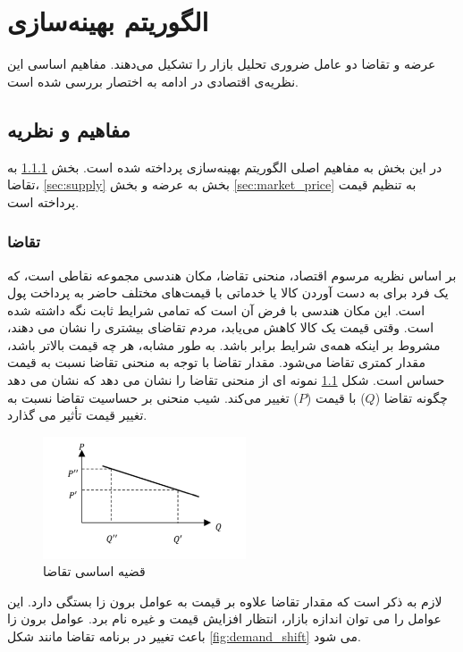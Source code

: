 \chapter{الگوریتم بهینه‌سازی }
عرضه و تقاضا دو عامل ضروری تحلیل بازار را تشکیل می‌دهند. مفاهیم اساسی این نظریه‌ی اقتصادی در ادامه به اختصار بررسی شده است.

\section{مفاهیم و نظریه}
در این بخش به مفاهیم اصلی الگوریتم بهینه‌سازی پرداخته شده است. بخش 
\ref{sec:demand}
به تقاضا، 
\ref{sec:supply} بخش
به عرضه
و بخش \ref{sec:market_price}
به تنظیم قیمت پرداخته است.

\subsection{تقاضا}\label{sec:demand}
بر اساس نظریه مرسوم اقتصاد، منحنی تقاضا، مکان هندسی مجموعه نقاطی است، که یک فرد برای به دست آوردن کالا یا خدماتی با قیمت‌های مختلف حاضر به پرداخت پول است. این مکان هندسی با فرض آن است که تمامی شرایط  ثابت نگه داشته شده است. 
 وقتی قیمت یک کالا کاهش می‌یابد، مردم تقاضای بیشتری را نشان می دهند، مشروط بر اینکه همه‌ی شرایط برابر باشد. به طور مشابه، هر چه قیمت بالاتر باشد، مقدار کمتری تقاضا می‌شود. مقدار تقاضا با توجه به منحنی تقاضا نسبت به قیمت حساس است. شکل \ref{fig:demand} نمونه ای از منحنی تقاضا را نشان می دهد که نشان می دهد چگونه تقاضا ($Q$) با قیمت ($P$) تغییر می‌کند. شیب منحنی بر حساسیت تقاضا نسبت به تغییر قیمت تأثیر می گذارد.
 
 \begin{figure}[H]
 	\includegraphics[width=6cm]{../Figure/introduction/demand.png}
 	\centering
 	\caption{قضیه اساسی تقاضا
 		\cite{Nobahari2022}}
 	\label{fig:demand}
 \end{figure}

لازم به ذکر است که مقدار تقاضا علاوه بر قیمت به عوامل برون زا بستگی دارد. این عوامل را می توان اندازه بازار، انتظار افزایش قیمت و غیره نام برد. عوامل برون زا باعث تغییر در برنامه تقاضا مانند شکل \ref{fig:demand_shift} می شود.

